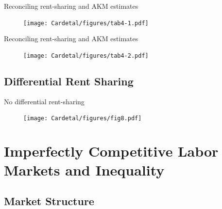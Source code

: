 \documentclass[notes=show]{beamer}
\begin{document}
\newpage
\begin{frame}{Reconciling rent-sharing and AKM estimates}
\begin{center}
\begin{figure}
\texttt{[image: Cardetal/figures/tab4-1.pdf]}
\end{figure} 
\end{center}
\end{frame}

\newpage
\begin{frame}{Reconciling rent-sharing and AKM estimates}
\begin{center}
\begin{figure}
\texttt{[image: Cardetal/figures/tab4-2.pdf]}
\end{figure} 
\end{center}
\end{frame}

\subsection*{Differential Rent Sharing}

\newpage
\begin{frame}{No differential rent-sharing}
\begin{center}
\begin{figure}
\texttt{[image: Cardetal/figures/fig8.pdf]}
\end{figure} 
\end{center}
\end{frame}

\section{Imperfectly Competitive Labor Markets and Inequality}

\subsection*{Market Structure}
\end{document}
